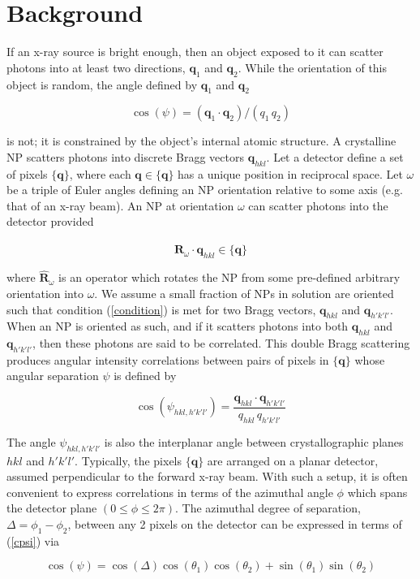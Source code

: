\documentclass [11pt,fleqn]{article}
\def \be {\begin{equation}}
\def \ee {\end{equation}}
\begin{document}
\section{Background}
If an x-ray source is bright enough, then an object exposed to it can scatter photons into at least two directions, $\bm q_1$ and $\bm q_2$. While the orientation of this object is random, the angle defined by $\bm q_1$ and $\bm q_2$ 

\be \label{cpsi}
\cos (\psi) = (\bm q_1 \cdot \bm q_2)/(q_1 \, q_2 )
\ee

is not; it is constrained by the object's internal atomic structure. A crystalline NP scatters photons into discrete Bragg vectors $\bm q_{hkl}$. Let a detector define a set of pixels $\{\bm q\}$, where each $\bm q \in \{\bm q\}$ has a unique position in reciprocal space. Let $\omega$ be a triple of Euler angles defining an NP orientation relative to some axis (e.g. that of an x-ray beam). An NP at orientation $\omega$ can scatter photons into the detector provided

\be \label{condition}
\hat{\bm R}_\omega \cdot \bm q_{hkl} \in \{\bm q\}
\ee

where $\hat{\bm R}_\omega$ is an operator which rotates the NP from some pre-defined arbitrary orientation into $\omega$. We assume a small fraction of NPs in solution are oriented such that condition (\ref{condition}) is met for two Bragg vectors, $\bm q_{hkl}$ and $\bm q_{h'k'l'}$. When an NP is oriented as such, and if it scatters photons into both $\bm q_{hkl}$ and $\bm q_{h'k'l'}$, then these photons are said to be correlated. This double Bragg scattering produces angular intensity correlations between pairs of pixels in $\{\bm q\}$ whose angular separation $\psi$ is defined by

\be \label{hklcorr}
\cos(\psi_{hkl,h'k'l'}) =\frac{ \bm q_{hkl} \cdot \bm q_{h'k'l'} } {q_{hkl}\, q_{h'k'l'}} 
\ee

The angle $\psi_{hkl,h'k'l'}$ is also the interplanar angle between crystallographic planes $hkl$ and $h'k'l'$. Typically, the pixels $\{\bm q\}$ are arranged on a planar detector, assumed perpendicular to the forward x-ray beam. With such a setup, it is often convenient to express correlations in terms of the azimuthal angle $\phi$ which spans the detector plane $(0 \le \phi \le 2\pi)$. The azimuthal degree of separation, $\Delta = \phi_1  - \phi_2$, between any 2 pixels on the detector can be expressed in terms of (\ref{cpsi}) via

\be \label{project}
\cos(\psi) = \cos( \Delta )\cos( \theta_1)\cos(\theta_2) + \sin(\theta_1)\sin(\theta_2)
\ee
\end{document}
